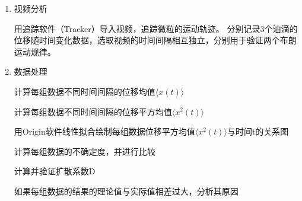 \documentclass[12pt,a4paper,UTF8]{ctexart}
\begin{document}
\begin{enumerate}
\begin{enumerate}[label=\roman*.]
用以上测量得到的不同半径的3个油滴，分别录制5组视频记录油滴布朗运动情况。每组视频120s，以1秒为间隔，记录油滴的位置数据。
（由于录制过程中帧数存在不稳定的情况，真实间隔为1.004秒；但仍可保证间隔时间一致）
            \item 验证位移平方均值关系

用以上测量得到的不同半径的3个油滴，分别录制0-5秒、0-10秒、0-15秒、0-20秒、0-25秒、0-30秒的视频记录油滴布朗运动情况。不同时间间隔各自测量10组。
总计录制180个视频。每组视频取开头与结尾，记录油滴的位置数据。

保证每个视频中油滴运动相互独立，不存在时间间隔的重叠。
        \end{enumerate}
	\item 视频分析

	用追踪软件（Tracker）导入视频，追踪微粒的运动轨迹。
	分别记录3个油滴的位移随时间变化数据，选取视频的时间间隔相互独立，分别用于验证两个布朗运动规律。
	
	\item 数据处理

计算每组数据不同时间间隔的位移均值$\langle x(t)\rangle$

计算每组数据不同时间间隔的位移平方均值$\langle x^2(t)\rangle$

用Origin软件线性拟合绘制每组数据位移平方均值$\langle x^2(t)\rangle$与时间t的关系图

计算每组数据的不确定度，并进行比较

计算并验证扩散系数D

如果每组数据的结果的理论值与实际值相差过大，分析其原因

\end{enumerate}
\end{document}
